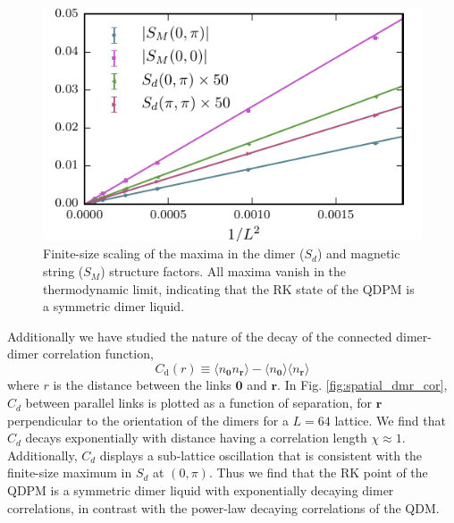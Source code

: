 \documentclass[twocolumn,prb,aps,floatfix,superscriptaddress]{revtex4-1}
\newcommand{\figref}[1]{Fig. \ref{#1}}
\begin{document}
\begin{figure}[t]
    \centering
    \includegraphics[width=1.0\columnwidth]{peak_scaling.pdf}
    \caption{Finite-size scaling of the maxima in the dimer ($S_d$) and magnetic string ($S_M$) structure factors. All maxima vanish in the thermodynamic limit, indicating that the RK state of the QDPM is a symmetric dimer liquid. }
    \label{fig:bragg_scaling}
\end{figure}

Additionally we have studied the nature of the decay of the connected dimer-dimer correlation function,
  \begin{equation}
    C_{\mathrm{d}} \left(r\right) \equiv \langle n_{\bm{0}} n_{\bm{r}} \rangle - \langle n_{\bm{0}} \rangle   \langle n_{\bm{r}} \rangle   
\end{equation}
where $r$ is the distance between the links $\bm{0}$ and $\bm{r}$. In \figref{fig:spatial_dmr_cor}, $C_d$ between parallel links is plotted as a function of separation, for $\bm{r}$ perpendicular to the orientation of the dimers for a $L=64$ lattice. We find that $C_d$ decays exponentially with distance having a correlation length  $\chi\approx 1$. Additionally, $C_d$ displays a sub-lattice oscillation that is consistent with the finite-size maximum in $S_d$ at $(0,\pi)$. Thus we find that the RK point of the QDPM is a symmetric dimer liquid with exponentially decaying dimer correlations, in contrast with the power-law decaying correlations of the QDM.
\end{document}
